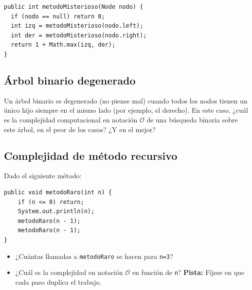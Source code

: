 \documentclass[a4paper]{article}
\newcommand{\code}[1]{\texttt{#1}}
\newcommand{\bigO}{\mathcal{O}}
\begin{document}
\begin{verbatim}
public int metodoMisterioso(Node nodo) {
  if (nodo == null) return 0;
  int izq = metodoMisterioso(nodo.left);
  int der = metodoMisterioso(nodo.right);
  return 1 + Math.max(izq, der);
}
\end{verbatim}

\subsection{Árbol binario degenerado}

Un árbol binario es degenerado (no piense mal) cuando todos los nodos tienen un único hijo siempre en el mismo lado (por ejemplo, el derecho). En este caso, ¿cuál es la complejidad computacional en notación $\bigO$ de una búsqueda binaria sobre este árbol, en el peor de los casos? ¿Y en el mejor?

\subsection{Complejidad de método recursivo}

Dado el siguiente método:

\begin{verbatim}
public void metodoRaro(int n) {
    if (n <= 0) return;
    System.out.println(n);
    metodoRaro(n - 1);
    metodoRaro(n - 1);
}
\end{verbatim}

\begin{itemize}
    \item ¿Cuántas llamadas a \code{metodoRaro} se hacen para \code{n=3}?
    \item ¿Cuál es la complejidad en notación $\bigO$ en función de \code{n}? \textbf{Pista:} Fíjese en que cada paso duplica el trabajo.
\end{itemize}
\end{document}
